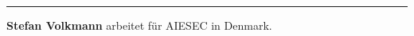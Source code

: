 \begin{center}\rule{0.5\linewidth}{\linethickness}\end{center}

\textbf{Stefan Volkmann} arbeitet für AIESEC in Denmark.
